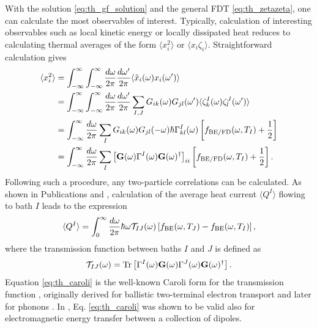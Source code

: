 With the solution \eqref{eq:th_gf_solution} and the general FDT \eqref{eq:th_zetazeta}, one can calculate the most observables of interest. Typically, calculation of interesting observables such as local kinetic energy or locally dissipated heat reduces to calculating thermal averages of the form $\langle x_i^2 \rangle$ or $\langle x_i\zeta_i \rangle$. Straightforward calculation gives
\begin{alignat}{2}
 \langle x_i^2 \rangle &= \int_{-\infty}^{\infty}  \int_{-\infty}^{\infty} \frac{d\omega}{2\pi} \frac{d\omega'}{2\pi} \langle \tilde x_i(\omega)x_i(\omega') \rangle \\
  &= \int_{-\infty}^{\infty}  \int_{-\infty}^{\infty} \frac{d\omega}{2\pi} \frac{d\omega'}{2\pi} \sum_{I,J} G_{ik}(\omega) G_{jl}(\omega') \langle \zeta^I_k(\omega) \zeta^J_l(\omega') \rangle \\
  &= \int_{-\infty}^{\infty}  \frac{d\omega}{2\pi} \sum_{I}G_{ik}(\omega) G_{jl}(-\omega) \hbar \Gamma^I_{kl}(\omega) \left[f_{\textrm{BE}/\textrm{FD}}(\omega,T_I)+ \frac{1}{2} \right]\\
  &=  \int_{-\infty}^{\infty}  \frac{d\omega}{2\pi} \sum_I \left[\mathbf{G}(\omega) \Gamma^I(\omega) \mathbf{G}(\omega)^{\dagger} \right]_{ii}\left[f_{\textrm{BE}/\textrm{FD}}(\omega,T_I)+ \frac{1}{2} \right].
\end{alignat}
Following such a procedure, any two-particle correlations can be calculated. As shown in Publications  and , calculation of the average heat current $\langle Q^I \rangle$ flowing to bath $I$ leads to the expression
\begin{equation}
 \langle Q^I \rangle = \int_0^{\infty} \frac{d\omega}{2\pi} \hbar \omega \mathcal{T}_{IJ}(\omega) \left[ f_{\textrm{BE}}(\omega,T_J)- f_{\textrm{BE}}(\omega,T_I)\right],
\end{equation}
where the transmission function between baths $I$ and $J$ is defined as
\begin{equation}
 \mathcal{T}_{IJ}(\omega) = \textrm{Tr}\left[\Gamma^I(\omega) \mathbf{G}(\omega) \Gamma^J(\omega) \mathbf{G}(\omega)^{\dagger} \right]. \label{eq:th_caroli}
\end{equation}
Equation \eqref{eq:th_caroli} is the well-known Caroli form for the transmission function \cite{caroli71}, originally derived for ballistic two-terminal electron transport and later for phonons \cite{mingo06,yamamoto06}. In , Eq. \eqref{eq:th_caroli} was shown to be valid also for electromagnetic energy transfer between a collection of dipoles.

